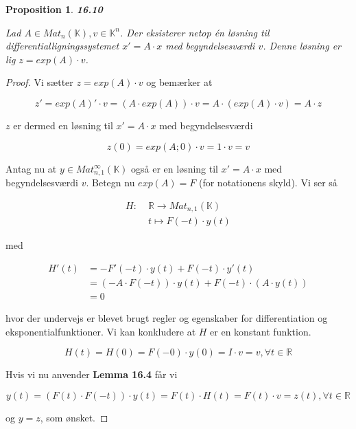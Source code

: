 \documentclass[paper=a4, fontsize=11pt]{scrartcl} %
\newtheorem*{proposition}{Proposition}
\newenvironment{cstmproposition}[1]{\begin{proposition} {\normalfont\textbf{#1}}}{\end{proposition}}
\begin{document}
	\begin{cstmproposition}{16.10}
		
		Lad $A \in Mat_n(\mathbb{K}), v \in \mathbb{K}^n$. Der eksisterer netop én løsning til differentialligningssystemet $x' = A \cdot x$ med begyndelsesværdi $v$. Denne løsning er lig $z = exp(A) \cdot v$.
		
	\end{cstmproposition}
	
	\begin{proof}
		
		Vi sætter $z = exp(A) \cdot v$ og bemærker at
		
		\[z' = exp(A)' \cdot v = (A \cdot exp(A)) \cdot v = A \cdot (exp(A) \cdot v) = A \cdot z\]
		
		$z$ er dermed en løsning til $x' = A \cdot x$ med begyndelsesværdi
		
		\[z(0) = exp(A;0) \cdot v = 1 \cdot v = v\]
		
		Antag nu at $y \in Mat_{n,1}^{\infty}(\mathbb{K})$ også er en løsning til $x' = A \cdot x$ med begyndelsesværdi $v$. Betegn nu $exp(A) = F$ (for notationens skyld). Vi ser så
		
		\begin{align*}
			H: \; &\mathbb{R} \rightarrow Mat_{n,1}(\mathbb{K})\\
			&t \mapsto F(-t) \cdot y(t)
		\end{align*}
		
		med 
		
		\begin{align*}
			H'(t) &= -F'(-t) \cdot y(t) + F(-t) \cdot y'(t) \\
			&= (-A\cdot F(-t)) \cdot y(t) + F(-t) \cdot (A \cdot y(t))\\
			&= 0
		\end{align*}
		
		hvor der undervejs er blevet brugt regler og egenskaber for differentiation og eksponentialfunktioner. Vi kan konkludere at $H$ er en konstant funktion.
		
		\[H(t) = H(0) = F(-0) \cdot y(0) = I \cdot v = v, \forall t \in \mathbb{R}\]
		
		Hvis vi nu anvender \textbf{Lemma 16.4} får vi
		
		\[y(t) = (F(t) \cdot F(-t)) \cdot y(t) = F(t) \cdot H(t) = F(t) \cdot v = z(t), \forall t \in \mathbb{R}\]
		
		og $y = z$, som ønsket.
		
		
	\end{proof}
	
\end{document}
